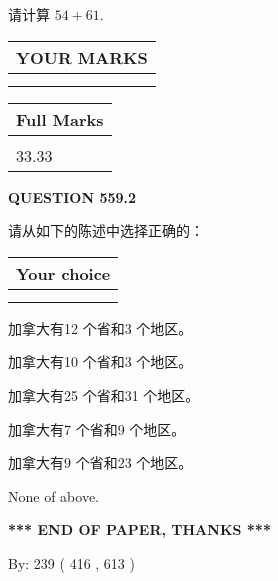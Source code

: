 \documentclass{ctexart}
\begin{document}
  
 
请计算 $ %
54 +  %
61 $.
 

 

 
  
\vspace{0.2in}
  
\noindent\begin{tabular}{|l|}
\hline
 YOUR MARKS  \\
\hline
 \\ 
 \\ 
\hline
\end{tabular}
\hspace{0.05in} \begin{tabular}{|l|}
\hline
 Full Marks  \\
\hline
 \\ 
33.33 \\
\hline
\end{tabular}
{\textbf{\Large{QUESTION
559.2 
}}}
  
  
请从如下的陈述中选择正确的：
  
  
\noindent\hspace{3.0in} \begin{tabular}{|l|}
\hline
Your choice \\
\hline
 \\ 
 \\ 
\hline
\end{tabular}
  
  
 
 
加拿大有12 个省和3 个地区。
 
 
加拿大有10 个省和3 个地区。
 
 
加拿大有25 个省和31 个地区。
 
 
加拿大有7 个省和9 个地区。
 
 
加拿大有9 个省和23 个地区。
 
 
 None of above.
 
 
   
   
 \vspace{0.2in}
 
   
   
   
   
\vspace{1.0in} 
{\textbf{\large{ *** END OF PAPER, THANKS *** }}} 
   
   
\hspace{1.0in} By: 
 239 ( 416 ,  613 )
   
\end{document}
